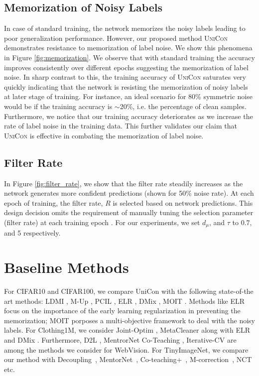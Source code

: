 \documentclass[10pt,twocolumn,letterpaper]{article}
\begin{document}
\subsection{Memorization of Noisy Labels}
In case of standard training, the network memorizes the noisy labels leading to poor generalization performance. However, our proposed method \textsc{UniCon} demonstrates resistance to memorization of label noise. We show this phenomena in Figure \ref{fig:memorization}. We observe that with standard training the accuracy improves consistently over different epochs suggesting the memorization of label noise. In sharp contrast to this, the training accuracy of \textsc{UniCon} saturates very quickly indicating that the network is resisting the memorization of noisy labels at later stage of training. For instance, an ideal scenario for 80\% symmetric noise would be if the training accuracy is $\sim$20\%, i.e. the percentage of clean samples. Furthermore, we notice that our training accuracy deteriorates as we increase the rate of label noise in the training data.  This further validates our claim that \textsc{UniCon} is effective in combating the memorization of label noise.  

\subsection{Filter Rate}
In Figure \ref{fig:filter_rate}, we show that the filter rate steadily increases as the network generates more confident predictions (shown for 50\% noise rate). At each epoch of training, the filter rate, $R$ is selected based on network predictions. This design decision omits the requirement of manually tuning the selection parameter (filter rate) at each training epoch \cite{yao2021jo}.  For our experiments, we set $d_{\mu}$, and $\tau$ to 0.7, and 5 respectively.  

\section{Baseline Methods}
For CIFAR10 and CIFAR100, we compare UniCon with the following state-of-the art methods: LDMI \cite{xu2019ldmi}, M-Up \cite{zhang2018mixup}, PCIL \cite{yi2019probabilistic}, ELR \cite{liu2020earlylearning}, DMix \cite{li2020dividemix}, MOIT \cite{ortego2021multiobjective}. Methods like ELR \cite{liu2020earlylearning} focus on the importance of the early learning regularization in preventing the memorization; MOIT \cite{ortego2021multiobjective} porposes a multi-objective framework to deal with the noisy labels. 
For Clothing1M, we consider Joint-Optim \cite{tanaka2018joint}, MetaCleaner \cite{zhang2019metacleaner} along with ELR \cite{liu2020earlylearning} and DMix  \cite{li2020dividemix} . Furthermore, D2L \cite{ma2018dimensionality}, MentrorNet \cite{jiang2018mentornet} 
Co-Teaching \cite{han2018co}, Iterative-CV \cite{wang2018iterative} are among the methods we consider for WebVision. For TinyImageNet, we compare our method with Decoupling~\cite{malach2017decoupling},  MentorNet~\cite{jiang2018mentornet}, Co-teaching+~\cite{yu2019does}, M-correction~\cite{arazo2019unsupervised}, NCT \cite{sarfraz2020noisy} etc. 
\end{document}
